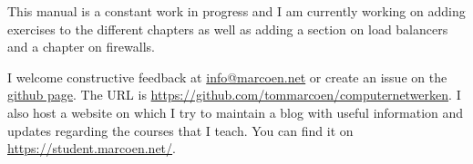 
This manual is a constant work in progress and I am currently working on adding exercises to the different chapters as well as adding a section on load balancers and a chapter on firewalls.

I welcome constructive feedback at \href{mailto:info@marcoen.net}{info@\-marcoen.net} or create an issue on the \href{https://github.com/tommarcoen/computernetwerken}{github page}.
The \acs{URL} is \url{https://github.com/tommarcoen/computernetwerken}.
I also host a website on which I try to maintain a blog with useful information and updates regarding the courses that I teach.
You can find it on \url{https://student.marcoen.net/}.
